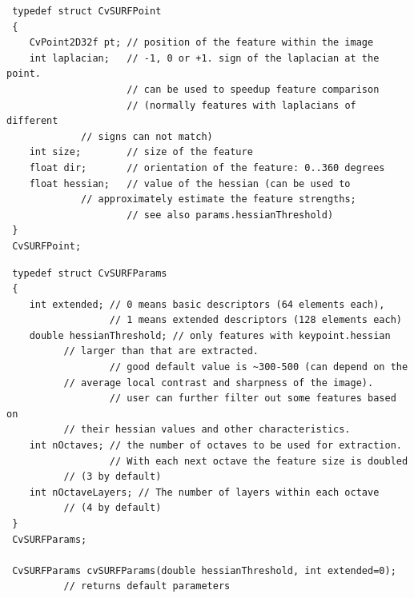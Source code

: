 \begin{description}
\begin{lstlisting}
 typedef struct CvSURFPoint
 {
    CvPoint2D32f pt; // position of the feature within the image
    int laplacian;   // -1, 0 or +1. sign of the laplacian at the point.
                     // can be used to speedup feature comparison
                     // (normally features with laplacians of different 
		     // signs can not match)
    int size;        // size of the feature
    float dir;       // orientation of the feature: 0..360 degrees
    float hessian;   // value of the hessian (can be used to 
		     // approximately estimate the feature strengths;
                     // see also params.hessianThreshold)
 }
 CvSURFPoint;
\end{lstlisting}
\begin{lstlisting}
 typedef struct CvSURFParams
 {
    int extended; // 0 means basic descriptors (64 elements each),
                  // 1 means extended descriptors (128 elements each)
    double hessianThreshold; // only features with keypoint.hessian 
		  // larger than that are extracted.
                  // good default value is ~300-500 (can depend on the 
		  // average local contrast and sharpness of the image).
                  // user can further filter out some features based on 
		  // their hessian values and other characteristics.
    int nOctaves; // the number of octaves to be used for extraction.
                  // With each next octave the feature size is doubled 
		  // (3 by default)
    int nOctaveLayers; // The number of layers within each octave 
		  // (4 by default)
 }
 CvSURFParams;

 CvSURFParams cvSURFParams(double hessianThreshold, int extended=0); 
		  // returns default parameters
\end{lstlisting}
\end{description}

